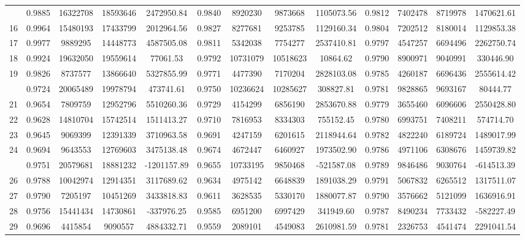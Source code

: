 \documentclass[
  12pt,
]{article}
\begin{document}
\begin{longtable}[t]{lcccccccccccc}
\addlinespace
15 & 0.9885 & 16322708 & 18593646 & 2472950.84 & 0.9840 & 8920230 & 9873668 & 1105073.56 & 0.9812 & 7402478 & 8719978 & 1470621.61\\
16 & 0.9964 & 15480193 & 17433799 & 2012964.56 & 0.9827 & 8277681 & 9253785 & 1129160.34 & 0.9804 & 7202512 & 8180014 & 1129853.38\\
17 & 0.9977 & 9889295 & 14448773 & 4587505.08 & 0.9811 & 5342038 & 7754277 & 2537410.81 & 0.9797 & 4547257 & 6694496 & 2262750.74\\
18 & 0.9924 & 19632050 & 19559614 & 77061.53 & 0.9792 & 10731079 & 10518623 & 10864.62 & 0.9790 & 8900971 & 9040991 & 330446.90\\
19 & 0.9826 & 8737577 & 13866640 & 5327855.99 & 0.9771 & 4477390 & 7170204 & 2828103.08 & 0.9785 & 4260187 & 6696436 & 2555614.42\\
\addlinespace
20 & 0.9724 & 20065489 & 19978794 & 473741.61 & 0.9750 & 10236624 & 10285627 & 308827.81 & 0.9781 & 9828865 & 9693167 & 80444.77\\
21 & 0.9654 & 7809759 & 12952796 & 5510260.36 & 0.9729 & 4154299 & 6856190 & 2853670.88 & 0.9779 & 3655460 & 6096606 & 2550428.80\\
22 & 0.9628 & 14810704 & 15742514 & 1511413.27 & 0.9710 & 7816953 & 8334303 & 755152.45 & 0.9780 & 6993751 & 7408211 & 574714.70\\
23 & 0.9645 & 9069399 & 12391339 & 3710963.58 & 0.9691 & 4247159 & 6201615 & 2118944.64 & 0.9782 & 4822240 & 6189724 & 1489017.99\\
24 & 0.9694 & 9643553 & 12769603 & 3475138.48 & 0.9674 & 4672447 & 6460927 & 1973502.90 & 0.9786 & 4971106 & 6308676 & 1459739.82\\
\addlinespace
25 & 0.9751 & 20579681 & 18881232 & -1201157.89 & 0.9655 & 10733195 & 9850468 & -521587.08 & 0.9789 & 9846486 & 9030764 & -614513.39\\
26 & 0.9788 & 10042974 & 12914351 & 3117689.62 & 0.9634 & 4975142 & 6648839 & 1891038.29 & 0.9791 & 5067832 & 6265512 & 1317511.07\\
27 & 0.9790 & 7205197 & 10451269 & 3433818.83 & 0.9611 & 3628535 & 5330170 & 1880077.87 & 0.9790 & 3576662 & 5121099 & 1636916.91\\
28 & 0.9756 & 15441434 & 14730861 & -337976.25 & 0.9585 & 6951200 & 6997429 & 341949.60 & 0.9787 & 8490234 & 7733432 & -582227.49\\
29 & 0.9696 & 4415854 & 9090557 & 4884332.71 & 0.9559 & 2089101 & 4549083 & 2610981.59 & 0.9781 & 2326753 & 4541474 & 2291041.54\\

\end{longtable}
\end{document}
